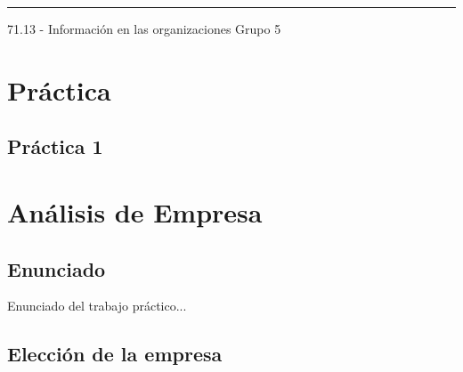 \documentclass[12pt,titlepage]{report}
\begin{document}
\begin{titlepage}
\vfill

\hrule
\vspace{0.2cm}

\noindent\small{71.13 - Información en las organizaciones \hfill Grupo 5}

\end{titlepage}



\setcounter{page}{1}

\tableofcontents
\newpage




\part{Práctica}

\chapter{Práctica 1}

%

\part{Análisis de Empresa}
\chapter*{Enunciado}
Enunciado del trabajo práctico...

\chapter{Elección de la empresa}


\end{document}
